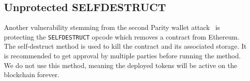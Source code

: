 \subsection{Unprotected SELFDESTRUCT}

Another vulnerability stemming from the second Parity wallet attack~\cite{ParitySecondHack} is protecting the \texttt{SELFDESTRUCT} opcode which removes a contract from Ethereum. The self-destruct method is used to kill the contract and its associated storage. It is recommended to get approval by multiple parties before running the method. We do not use this method, meaning the deployed \erc tokens will be active on the blockchain forever.

